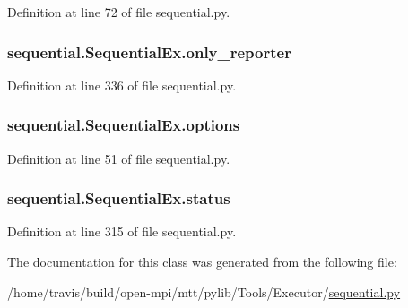 Definition at line 72 of file sequential.\-py.

\hypertarget{classsequential_1_1_sequential_ex_a7c81be8b211e0e01022948ce0a7d4e19}{
\subsubsection[{only\-\_\-reporter}]{\setlength{\rightskip}{0pt plus 5cm}sequential.\-Sequential\-Ex.\-only\-\_\-reporter}}\label{classsequential_1_1_sequential_ex_a7c81be8b211e0e01022948ce0a7d4e19}


Definition at line 336 of file sequential.\-py.

\hypertarget{classsequential_1_1_sequential_ex_a72ae94e2c46c2b1b8c5022eaf3593edf}{
\subsubsection[{options}]{\setlength{\rightskip}{0pt plus 5cm}sequential.\-Sequential\-Ex.\-options}}\label{classsequential_1_1_sequential_ex_a72ae94e2c46c2b1b8c5022eaf3593edf}


Definition at line 51 of file sequential.\-py.

\hypertarget{classsequential_1_1_sequential_ex_a7f8ca8932ced5d9daf6191598894eb58}{
\subsubsection[{status}]{\setlength{\rightskip}{0pt plus 5cm}sequential.\-Sequential\-Ex.\-status}}\label{classsequential_1_1_sequential_ex_a7f8ca8932ced5d9daf6191598894eb58}


Definition at line 315 of file sequential.\-py.



The documentation for this class was generated from the following file\-:\begin{DoxyCompactItemize}
\item 
/home/travis/build/open-\/mpi/mtt/pylib/\-Tools/\-Executor/\hyperlink{sequential_8py}{sequential.\-py}\end{DoxyCompactItemize}
